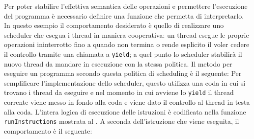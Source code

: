Per poter stabilire l'effettiva semantica delle operazioni e permettere l'esecuzione del programma è necessario definire una funzione che permetta di interpretarlo. In questo esempio il comportamento desiderato è quello di realizzare uno scheduler che esegua i thread in maniera cooperativa: un thread esegue le proprie operazioni ininterrotto fino a quando non termina o rende esplicito il voler cedere il controllo tramite una chiamata a \lstinline{yield}; a quel punto lo scheduler stabilirà il nuovo thread da mandare in esecuzione con la stessa politica.
Il metodo per eseguire un programma secondo questa politica di scheduling è il seguente:
Per semplificare l'implementazione dello scheduler, questo utilizza una coda in cui si trovano i thread da eseguire e nel momento in cui avviene lo \lstinline{yield} il thread corrente viene messo in fondo alla coda e viene dato il controllo al thread in testa alla coda.
L'intera logica di esecuzione delle istruzioni è codificata nella funzione \lstinline{runInstructions} mostrata al .
A seconda dell'istruzione che viene eseguita, il comportamento è il seguente:
